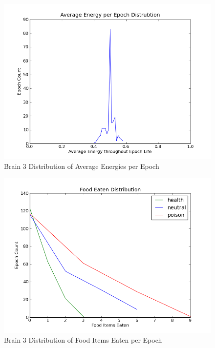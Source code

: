 \documentclass[a4paper,11pt]{article}
\begin{document}

\begin{figure}
\begin{center}
  \includegraphics[scale=1.0]{img/brain3/avgenergyGauss-0.05.png}
  \caption{Brain 3 Distribution of Average Energies per Epoch}
  \label{fig:b3avgenergy}
\end{center}
\end{figure}

\begin{figure}
\begin{center}
  \includegraphics[scale=1.0]{img/brain3/foodGauss-h1.12-n2.24-p3.35.png}
  \caption{Brain 3 Distribution of Food Items Eaten per Epoch}
  \label{fig:b3food}
\end{center}
\end{figure}
\end{document}
